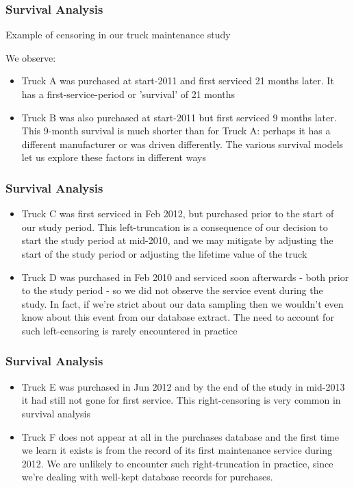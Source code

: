 \begin{frame}
	\frametitle{Survival Analysis}
	Example of censoring in our truck maintenance study
	
	We observe:
\begin{itemize}
	\item 	Truck A was purchased at start-2011 and first serviced 21 months later. It has a first-service-period or 'survival' of 21 months
	
\item Truck B was also purchased at start-2011 but first serviced 9 months later. This 9-month survival is much shorter than for Truck A: perhaps it has a different manufacturer or was driven differently. The various survival models let us explore these factors in different ways
\end{itemize}	

\end{frame}
\begin{frame}
	\frametitle{Survival Analysis}
\begin{itemize}
	\item 	Truck C was first serviced in Feb 2012, but purchased prior to the start of our study period. This left-truncation is a consequence of our decision to start the study period at mid-2010, and we may mitigate by adjusting the start of the study period or adjusting the lifetime value of the truck
	
\item Truck D was purchased in Feb 2010 and serviced soon afterwards - both prior to the study period - so we did not observe the service event during the study. In fact, if we're strict about our data sampling then we wouldn't even know about this event from our database extract. The need to account for such left-censoring is rarely encountered in practice
\end{itemize}

\end{frame}
\begin{frame}
	\frametitle{Survival Analysis}
\begin{itemize}
	\item 	Truck E was purchased in Jun 2012 and by the end of the study in mid-2013 it had still not gone for first service. This right-censoring is very common in survival analysis
	
\item	Truck F does not appear at all in the purchases database and the first time we learn it exists is from the record of its first maintenance service during 2012. We are unlikely to encounter such right-truncation in practice, since we're dealing with well-kept database records for purchases.
\end{itemize}

\end{frame}
